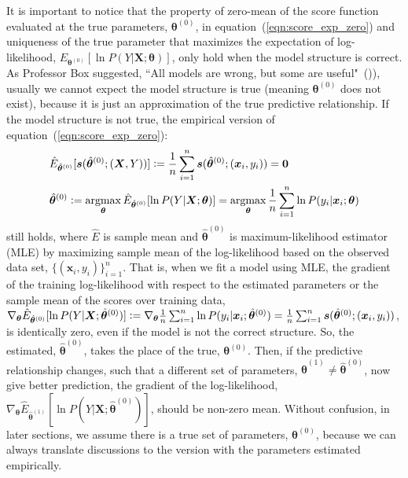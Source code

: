 \documentclass[twoside,11pt]{article}
\DeclareMathOperator*{\argmax}{argmax} %
\begin{document}
It is important to notice that the property of zero-mean of the score function evaluated at the true parameters, $\bm{\theta}^{(0)}$, in equation~(\ref{eqn:score_exp_zero}) and uniqueness of the true parameter that maximizes the expectation of log-likelihood, $E_{\bm{\theta}^{(0)}}[\ln{P(Y|\bm{X};\bm{\theta})}]$, only hold when the model structure is correct. As Professor Box suggested, ``All models are wrong, but some are useful"~(\cite{box1976science})), usually we cannot expect the model structure is true (meaning $\bm{\theta}^{(0)}$ does not exist), because it is just an approximation of the true predictive relationship. If the model structure is not true, the empirical version of equation~(\ref{eqn:score_exp_zero}):
\begin{align}
\begin{aligned}
&\hat{E}_{\hat{\bm{\theta}}^{(0)}}[\bm{s}(\hat{\bm{\theta}}^{(0)};(\bm{X}, Y))] \vcentcolon=\frac{1}{n}\sum_{i=1}^{n}\bm{s}(\hat{\bm{\theta}}^{(0)};(\bm{x}_i, y_i))=\bm{0}\\
&\hat{\bm{\theta}}^{(0)} \vcentcolon= \argmax_{\bm{\theta}}\hat{E}_{\hat{\bm{\theta}}^{(0)}}[\ln{P(Y|\bm{X}; \bm{\theta})}]=\argmax_{\bm{\theta}}\frac{1}{n}\sum_{i=1}^n \ln{P(y_i|\bm{x}_i;\bm{\theta})}
\end{aligned}
\label{eqn:score_exp_zero_emp}
\end{align}   
still holds, where $\hat{E}$ is sample mean and $\hat{\bm{\theta}}^{(0)}$ is maximum-likelihood estimator (MLE) by maximizing sample mean of the log-likelihood based on the observed data set, $\{(\bm{x}_i, y_i)\}_{i=1}^n$. That is, when we fit a model using MLE, the gradient of the training log-likelihood with respect to the estimated parameters or the sample mean of the scores over training data, $\nabla_{\bm{\theta}}\hat{E}_{\hat{\bm{\theta}}^{(0)}}[\ln{P(Y|\bm{X}; \hat{\bm{\theta}}^{(0)})}]\vcentcolon=\nabla_{\bm{\theta}}\frac{1}{n}\sum_{i=1}^n \ln{P(y_i|\bm{x}_i;\hat{\bm{\theta}}^{(0)})}=\frac{1}{n}\sum_{i=1}^n\bm{s}(\hat{\bm{\theta}}^{(0)};(\bm{x}_i, y_i))$, is identically zero, even if the model is not the correct structure. So, the estimated, $\hat{\bm{\theta}}^{(0)}$, takes the place of the true, $\bm{\theta}^{(0)}$. Then, if the predictive relationship changes, such that a different set of parameters, $\hat{\bm{\theta}}^{(1)}\neq \hat{\bm{\theta}}^{(0)}$, now give better prediction, the gradient of the log-likelihood, $\nabla_{\bm{\theta}}\hat{E}_{\hat{\bm{\theta}}^{(1)}}[\ln{P(Y|\bm{X}; \hat{\bm{\theta}}^{(0)})}]$, should be non-zero mean. Without confusion, in later sections, we assume there is a true set of parameters, $\bm{\theta}^{(0)}$, because we can always translate discussions to the version with the parameters estimated empirically.
\end{document}
